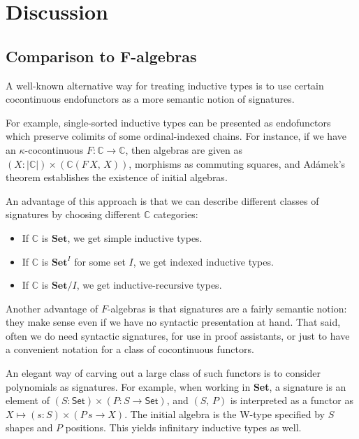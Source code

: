 \documentclass[12pt,a4paper,twoside,openany]{book}
\theoremstyle{remark}
\theoremstyle{definition}
\theoremstyle{theorem}
\newcommand{\mbb}[1]{\mathbb{#1}}
\newcommand{\mbf}[1]{\mathbf{#1}}
\newcommand{\Set}{\mathsf{Set}}
\begin{document}
\section{Discussion}

\subsection{Comparison to F-algebras}

A well-known alternative way for treating inductive types is to use certain
cocontinuous endofunctors as a more semantic notion of signatures.

For example, single-sorted inductive types can be presented as endofunctors
which preserve colimits of some ordinal-indexed chains. For instance, if we have
an $\kappa$-cocontinuous $F : \mbb{C} \to \mbb{C}$, then algebras are given as
$(X : |\mbb{C}|) \times (\mbb{C}(F\,X,\,X))$, morphisms as commuting squares,
and Adámek's theorem \cite{adamek} establishes the existence of initial
algebras.

An advantage of this approach is that we can describe different classes of
signatures by choosing different $\mbb{C}$ categories:
\begin{itemize}
  \item If $\mbb{C}$ is $\mbf{Set}$, we get simple inductive types.
  \item If $\mbb{C}$ is $\mbf{Set}^I$ for some set $I$, we get indexed inductive types.
  \item If $\mbb{C}$ is $\mbf{Set}/I$, we get inductive-recursive types.
\end{itemize}

Another advantage of $F$-algebras is that signatures are a fairly semantic
notion: they make sense even if we have no syntactic presentation at hand. That
said, often we do need syntactic signatures, for use in proof assistants, or
just to have a convenient notation for a class of cocontinuous functors.

An elegant way of carving out a large class of such functors is to
consider polynomials as signatures. For example, when working in \textbf{Set}, a
signature is an element of $(S : \Set) \times (P : S \to \Set)$, and $(S,\,P)$
is interpreted as a functor as $X \mapsto (s : S) \times (P\,s \to X)$. The
initial algebra is the W-type specified by $S$ shapes and $P$ positions. This
yields infinitary inductive types as well.
\end{document}
